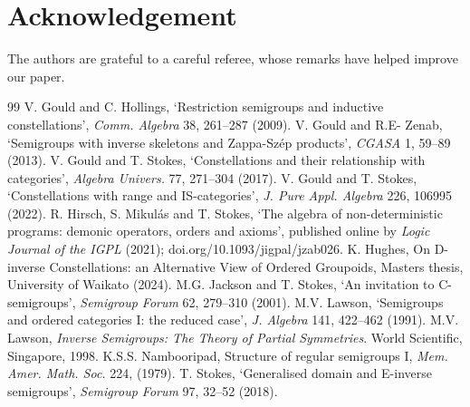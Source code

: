 \documentclass[12pt]{amsart}
\theoremstyle{definition}
\begin{document}
\section*{Acknowledgement} The authors are grateful to a careful referee, whose remarks have helped improve our paper.

\begin{thebibliography}{99}
 V. Gould and C. Hollings, `Restriction semigroups and inductive constellations', {\em Comm. Algebra} 38, 261--287 (2009).
  V. Gould and R.E- Zenab, `Semigroups with inverse skeletons and Zappa-Sz\'{e}p products', {\em CGASA} 1, 59--89 (2013).
 V. Gould and T. Stokes, `Constellations and their relationship with categories', {\em Algebra Univers.} 77,  271--304  (2017).
 V. Gould and T. Stokes, `Constellations with range and IS-categories', {\em J. Pure Appl. Algebra} 226, 106995 (2022).
 R. Hirsch, S. Mikul\'as and T. Stokes, `The algebra of non-deterministic programs: demonic operators, orders and axioms', published online by {\em Logic Journal of the IGPL} (2021); doi.org/10.1093/jigpal/jzab026. 
 K. Hughes, On D-inverse Constellations: an Alternative View
of Ordered Groupoids, Masters thesis, University of Waikato (2024).
 M.G. Jackson and T. Stokes, `An invitation to C-semigroups',
{\em Semigroup Forum} 62, 279--310 (2001).
 M.V. Lawson, `Semigroups and ordered categories I: the reduced case', {\em J. Algebra} 141, 422--462 (1991).
  M.V. Lawson, {\em Inverse Semigroups: The Theory of Partial Symmetries}. World Scientific, Singapore, 1998. 
 K.S.S. Nambooripad, Structure of regular semigroups I, {\em Mem. Amer. Math. Soc.} 224, (1979).
 T. Stokes, `Generalised domain and E-inverse semigroups', {\em Semigroup Forum}  97,  32--52 (2018).
\end{thebibliography}
\end{document}
